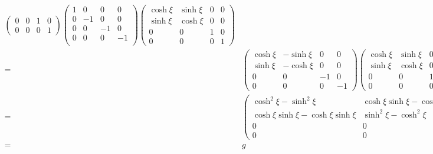 \begin{frame}
\begin{align}
\begin{pmatrix}
    0     &  0  &1&0\\
    0     &  0  &0&1
  \end{pmatrix}
  \begin{pmatrix}
    1 & 0  & 0 &0\\
    0 & -1 & 0 &0\\
    0 & 0  & -1&0\\
    0 & 0  & 0 &-1\\
  \end{pmatrix}
  \begin{pmatrix}
    \cosh\xi&\sinh\xi&0&0\\
    \sinh\xi&\cosh\xi&0&0\\
    0     &  0  &1&0\\
    0     &  0  &0&1
  \end{pmatrix}\nonumber\\
  =&\begin{pmatrix}
       \cosh\xi&-\sinh\xi&0&0\\
    \sinh\xi&-\cosh\xi&0&0\\
    0     &  0  &-1&0\\
    0     &  0  &0&-1
  \end{pmatrix}
 \begin{pmatrix}
    \cosh\xi&\sinh\xi&0&0\\
    \sinh\xi&\cosh\xi&0&0\\
    0     &  0  &1&0\\
    0     &  0  &0&1
  \end{pmatrix}\nonumber\\
  =&\begin{pmatrix}
       \cosh^2\xi-\sinh^2\xi&\cosh\xi\sinh\xi-\cosh\xi\sinh\xi&0&0\\
    \cosh\xi\sinh\xi-\cosh\xi\sinh\xi&\sinh^2\xi-\cosh^2\xi&0&0\\
    0     &  0  &-1&0\\
    0     &  0  &0&-1
  \end{pmatrix}\nonumber\\
=&g
\end{align}
\end{frame}


